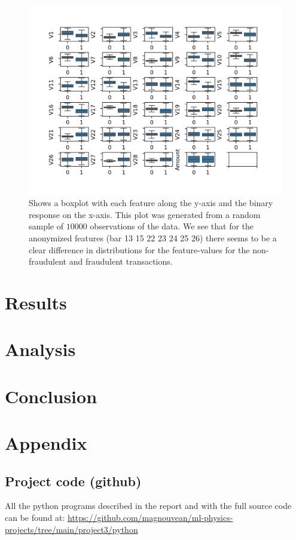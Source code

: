 \documentclass{article}
\begin{document}
\begin{figure}
	\centering
	\includegraphics[scale=0.8]{data_features_boxplot}
	\caption{Shows a boxplot with each feature along the y-axis and the
		binary response on the x-axis. This plot was generated from a random
		sample of $10 000$ observations of the data. We see that for the anonymized
		features (bar 13 15 22 23 24 25 26) there seems to be a clear difference in
		distributions for the feature-values for the non-fraudulent and fraudulent
		transactions.}
	\label{databoxplot}
\end{figure}

\section{Results}

\section{Analysis}

\section{Conclusion}

\section{Appendix}

\subsection{Project code (github)}
All the python programs described in the report and with the full source code can be
found at:
\url{https://github.com/magnouvean/ml-physics-projects/tree/main/project3/python}


\end{document}
